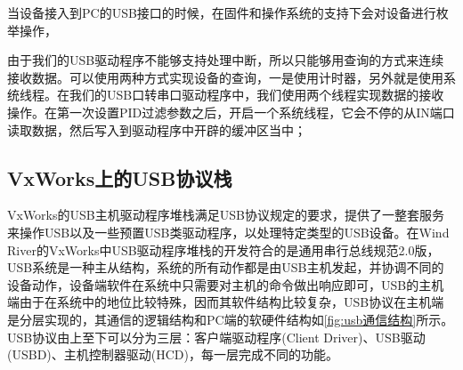 	当设备接入到PC的USB接口的时候，在固件和操作系统的支持下会对设备进行枚举操作，
	
	由于我们的USB驱动程序不能够支持处理中断，所以只能够用查询的方式来连续接收数据。可以使用两种方式实现设备的查询，一是使用计时器，另外就是使用系统线程。在我们的USB口转串口驱动程序中，我们使用两个线程实现数据的接收操作。在第一次设置PID过滤参数之后，开启一个系统线程，它会不停的从IN端口读取数据，然后写入到驱动程序中开辟的缓冲区当中；

\subsection{VxWorks上的USB协议栈}
	VxWorks的USB主机驱动程序堆栈满足USB协议规定的要求，提供了一整套服务来操作USB以及一些预置USB类驱动程序，以处理特定类型的USB设备。在Wind River的VxWorks中USB驱动程序堆栈的开发符合的是通用串行总线规范2.0版，USB系统是一种主从结构，系统的所有动作都是由USB主机发起，并协调不同的设备动作，设备端软件在系统中只需要对主机的命令做出响应即可，USB的主机端由于在系统中的地位比较特殊，因而其软件结构比较复杂，USB协议在主机端是分层实现的，其通信的逻辑结构和PC端的软硬件结构如\autoref{fig:usb通信结构}所示。USB协议由上至下可以分为三层：客户端驱动程序(Client Driver)、USB驱动(USBD)、主机控制器驱动(HCD)，每一层完成不同的功能。

